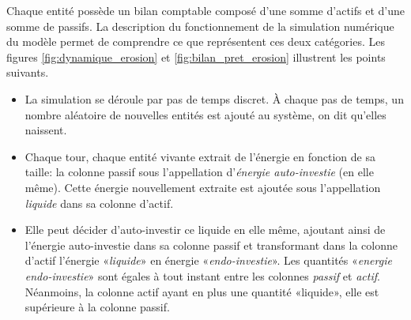 \documentclass[10pt,a4paper]{article}
\begin{document}
Chaque entité possède un bilan comptable composé d'une somme d'actifs et d'une somme de passifs. La description du fonctionnement de la simulation numérique du modèle permet de comprendre ce que représentent ces deux catégories. Les figures \ref{fig:dynamique_erosion} et \ref{fig:bilan_pret_erosion} illustrent les points suivants.
\begin{itemize}
\item La simulation se déroule par pas de temps discret. À chaque pas de temps, un nombre aléatoire de nouvelles entités est ajouté au système, on dit qu'elles naissent. 
\item Chaque tour, chaque entité vivante extrait de l'énergie en fonction de sa taille: la colonne passif sous l’appellation d'\textit{énergie auto-investie} (en elle même). Cette énergie nouvellement extraite est ajoutée sous l'appellation \textit{liquide} dans sa colonne d'actif.
\item Elle peut décider d'auto-investir ce liquide en elle même, ajoutant ainsi de l'énergie auto-investie dans sa colonne passif et transformant dans la colonne d'actif l'énergie «\textit{liquide}» en énergie «\textit{endo-investie}». Les quantités «\textit{energie endo-investie}» sont égales à tout instant entre les colonnes \textit{passif} et \textit{actif}. Néanmoins, la colonne actif ayant en plus une quantité «liquide», elle est supérieure à la colonne passif.


\end{itemize}
\end{document}
